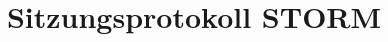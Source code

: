 \documentclass[a4paper]{article}
\begin{document}
	\title{Sitzungsprotokoll STORM}
	\date{}
	\maketitle

	
	
\end{document}
